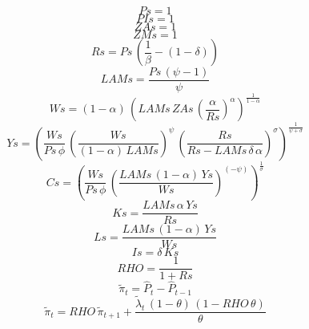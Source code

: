 \begin{dmath*}
Ps = 1
\end{dmath*}
\begin{dmath*}
PIs = 1
\end{dmath*}
\begin{dmath*}
ZAs = 1
\end{dmath*}
\begin{dmath*}
ZMs = 1
\end{dmath*}
\begin{dmath*}
Rs = {Ps}\, \left(\frac{1}{{{\beta}}}-\left(1-{{\delta}}\right)\right)
\end{dmath*}
\begin{dmath*}
LAMs = \frac{{Ps}\, \left({{\psi}}-1\right)}{{{\psi}}}
\end{dmath*}
\begin{dmath*}
Ws = \left(1-{{\alpha}}\right)\, \left({LAMs}\, {ZAs}\, \left(\frac{{{\alpha}}}{{Rs}}\right)^{{{\alpha}}}\right)^{\frac{1}{1-{{\alpha}}}}
\end{dmath*}
\begin{dmath*}
Ys = \left(\frac{{Ws}}{{Ps}\, {{\phi}}}\, \left(\frac{{Ws}}{\left(1-{{\alpha}}\right)\, {LAMs}}\right)^{{{\psi}}}\, \left(\frac{{Rs}}{{Rs}-{LAMs}\, {{\delta}}\, {{\alpha}}}\right)^{{{\sigma}}}\right)^{\frac{1}{{{\psi}}+{{\sigma}}}}
\end{dmath*}
\begin{dmath*}
Cs = \left(\frac{{Ws}}{{Ps}\, {{\phi}}}\, \left(\frac{{LAMs}\, \left(1-{{\alpha}}\right)\, {Ys}}{{Ws}}\right)^{\left(-{{\psi}}\right)}\right)^{\frac{1}{{{\sigma}}}}
\end{dmath*}
\begin{dmath*}
Ks = \frac{{LAMs}\, {{\alpha}}\, {Ys}}{{Rs}}
\end{dmath*}
\begin{dmath*}
Ls = \frac{{LAMs}\, \left(1-{{\alpha}}\right)\, {Ys}}{{Ws}}
\end{dmath*}
\begin{dmath*}
Is = {{\delta}}\, {Ks}
\end{dmath*}
\begin{dmath*}
RHO = \frac{1}{1+{Rs}}
\end{dmath*}
\begin{dmath}
{{\tilde{\pi}}}_{t}={{\hat{P}}}_{t}-{{\hat{P}}}_{t-1}
\end{dmath}
\begin{dmath}
{{\tilde{\pi}}}_{t}={RHO}\, {{\tilde{\pi}}}_{t+1}+\frac{{{\tilde{\lambda}}}_{t}\, \left(1-{{\theta}}\right)\, \left(1-{RHO}\, {{\theta}}\right)}{{{\theta}}}
\end{dmath}
